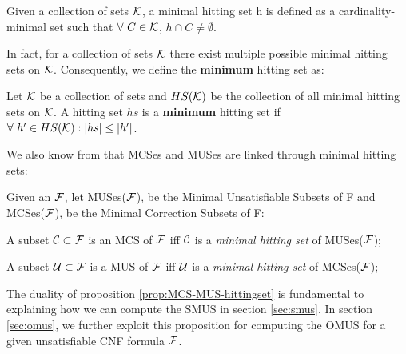 \begin{definition}\label{def:minimal-hs}
    Given a collection of sets $\mathcal{K}$, a minimal hitting set h is defined as a cardinality-minimal set such that $\forall \ C \in \mathcal{K}$, $h \cap C \neq \emptyset$.
\end{definition}

\noindent In fact, for a collection of sets $\mathcal{K}$ there exist multiple possible minimal hitting sets on $\mathcal{K}$. Consequently, we define the \textbf{minimum} hitting set as:

\begin{definition}\label{def:minimum-hs}
    Let $\mathcal{K}$ be a collection of sets and $HS(\mathcal{K})$ be the collection of all minimal hitting sets on $\mathcal{K}$.
    A hitting set $hs$ is a \textbf{minimum} hitting set if $\forall \ h' \in HS(\mathcal{K}): |hs| \leq |h'|$.
  \end{definition}

  \noindent We also know from \cite{liffiton2008algorithms,reiter1987theory} that MCSes and MUSes are linked through minimal hitting sets:

\begin{proposition}\label{prop:MCS-MUS-hittingset}
    Given an $ \mathcal{F}$, let MUSes($\mathcal{F}$), be the Minimal Unsatisfiable Subsets of F and MCSes($\mathcal{F}$), be the Minimal Correction Subsets of F:
    
    A subset  $\mathcal{C} \subset \mathcal{F}$ is an MCS of $ \mathcal{F}$ iff  $\mathcal{C}$ is a \emph{minimal hitting set} of MUSes($ \mathcal{F}$);

    A subset  $\mathcal{U} \subset \mathcal{F}$ is a MUS of $ \mathcal{F}$ iff  $\mathcal{U}$ is a \emph{minimal hitting set} of MCSes($ \mathcal{F}$);
\end{proposition}

The duality of proposition \ref{prop:MCS-MUS-hittingset} is fundamental to explaining how we can compute the SMUS in section \ref{sec:smus}. 
In section \ref{sec:omus}, we further exploit this proposition for computing the OMUS for a given unsatisfiable CNF formula $\mathcal{F}$.